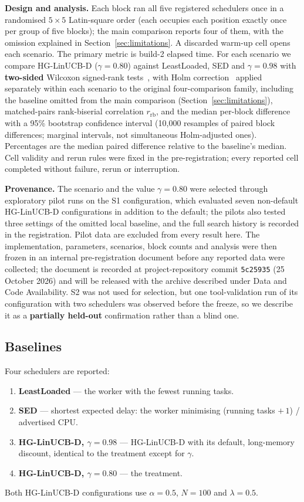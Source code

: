 \documentclass[final,5p,times,twocolumn]{elsarticle}
\begin{document}
\textbf{Design and analysis.} Each block ran all five registered schedulers once in a randomised $5\times5$ Latin-square order (each occupies each position exactly once per group of five blocks); the main comparison reports four of them, with the omission explained in Section~\ref{sec:limitations}. A discarded warm-up cell opens each scenario. The primary metric is build-2 elapsed time. For each scenario we compare HG-LinUCB-D ($\gamma=0.80$) against LeastLoaded, SED and $\gamma=0.98$ with \textbf{two-sided} Wilcoxon signed-rank tests~\cite{wilcoxon1945}, with Holm correction~\cite{holm1979} applied separately within each scenario to the original four-comparison family, including the baseline omitted from the main comparison (Section~\ref{sec:limitations}), matched-pairs rank-biserial correlation $r_{\text{rb}}$, and the median per-block difference with a 95\% bootstrap confidence interval (10{,}000 resamples of paired block differences; marginal intervals, not simultaneous Holm-adjusted ones). Percentages are the median paired difference relative to the baseline's median. Cell validity and rerun rules were fixed in the pre-registration; every reported cell completed without failure, rerun or interruption.

\textbf{Provenance.} The scenario and the value $\gamma=0.80$ were selected through exploratory pilot runs on the S1 configuration, which evaluated seven non-default HG-LinUCB-D configurations in addition to the default; the pilots also tested three settings of the omitted local baseline, and the full search history is recorded in the registration. Pilot data are excluded from every result here. The implementation, parameters, scenarios, block counts and analysis were then frozen in an internal pre-registration document before any reported data were collected; the document is recorded at project-repository commit \texttt{5c25935} (25 October 2026) and will be released with the archive described under Data and Code Availability. S2 was not used for selection, but one tool-validation run of its configuration with two schedulers was observed before the freeze, so we describe it as a \textbf{partially held-out} confirmation rather than a blind one.

\subsection{Baselines}
\label{sec:baselines}

Four schedulers are reported:
\begin{enumerate}
\item \textbf{LeastLoaded} --- the worker with the fewest running tasks.
\item \textbf{SED} --- shortest expected delay: the worker minimising (running tasks $+\,1$) / advertised CPU.
\item \textbf{HG-LinUCB-D, $\gamma=0.98$} --- HG-LinUCB-D with its default, long-memory discount, identical to the treatment except for $\gamma$.
\item \textbf{HG-LinUCB-D, $\gamma=0.80$} --- the treatment.
\end{enumerate}
Both HG-LinUCB-D configurations use $\alpha=0.5$, $N=100$ and $\lambda=0.5$.
\end{document}
